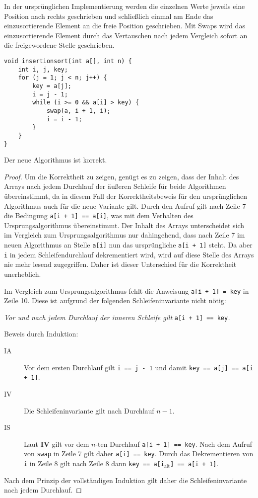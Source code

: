 \documentclass[11pt,a4paper]{article}
\begin{document}
\begin{loesung}
\begin{enumerate}
        In der ursprünglichen Implementierung werden die einzelnen Werte jeweils eine Position nach rechts geschrieben und schließlich einmal am Ende das einzusortierende Element an die freie Position geschrieben.
        Mit Swaps wird das einzusortierende Element durch das Vertauschen nach jedem Vergleich sofort an die freigewordene Stelle geschrieben.
        \begin{lstlisting}
void insertionsort(int a[], int n) {
    int i, j, key;
    for (j = 1; j < n; j++) {
        key = a[j];
        i = j - 1;
        while (i >= 0 && a[i] > key) {
            swap(a, i + 1, i);
            i = i - 1;
        }
    }
}
        \end{lstlisting}
        Der neue Algorithmus ist korrekt.
        \begin{proof}
            Um die Korrektheit zu zeigen, genügt es zu zeigen, dass der Inhalt des Arrays nach jedem Durchlauf der äußeren Schleife für beide Algorithmen übereinstimmt, da in diesem Fall der Korrektheitsbeweis für den ursprünglichen Algorithmus auch für die neue Variante gilt.
            Durch den Aufruf gilt nach Zeile 7 die Bedingung \texttt{a[i + 1] == a[i]}, was mit dem Verhalten des Ursprungsalgorithmus übereinstimmt.
            Der Inhalt des Arrays unterscheidet sich im Vergleich zum Ursprungsalgorithmus nur dahingehend, dass nach Zeile 7 im neuen Algorithmus an Stelle \texttt{a[i]} nun das ursprüngliche \texttt{a[i + 1]} steht.
            Da aber \texttt{i} in jedem Schleifendurchlauf dekrementiert wird, wird auf diese Stelle des Arrays nie mehr lesend zugegriffen.
            Daher ist dieser Unterschied für die Korrektheit unerheblich.

            Im Vergleich zum Ursprungsalgorithmus fehlt die Anweisung \texttt{a[i + 1] = key} in Zeile 10.
            Diese ist aufgrund der folgenden Schleifeninvariante nicht nötig: 
            \begin{center}
                \textit{Vor und nach jedem Durchlauf der inneren Schleife gilt }\texttt{a[i + 1] == key}\textit{.}
            \end{center}
            Beweis durch Induktion:
            \begin{description}
                \item[IA] Vor dem ersten Durchlauf gilt \texttt{i == j - 1} und damit \texttt{key == a[j] == a[i + 1]}.
                \item[IV] Die Schleifeninvariante gilt nach Durchlauf $n - 1$.
                \item[IS] Laut \textbf{IV} gilt vor dem $n$-ten Durchlauf \texttt{a[i + 1] == key}. Nach dem Aufruf von \texttt{swap} in Zeile 7 gilt daher \texttt{a[i] == key}. Durch das Dekrementieren von \texttt{i} in Zeile 8 gilt nach Zeile 8 dann \texttt{key == a[i}$_{\text{alt}}$\texttt{] == a[i + 1]}.
            \end{description}
            Nach dem Prinzip der vollständigen Induktion gilt daher die Schleifeninvariante nach jedem Durchlauf.


\end{proof}
\end{enumerate}
\end{loesung}
\end{document}
